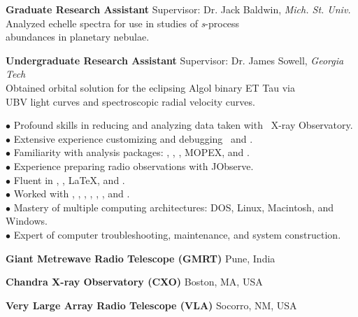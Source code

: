 \documentclass[12pt]{cv}
\begin{document}
\begin{llist}

{\sc \bf{Graduate Research Assistant}}
Supervisor: Dr. Jack Baldwin, {\textit{Mich. St. Univ.}}\\
Analyzed echelle spectra for use in studies of {\textit{s}}-process\\
abundances in planetary nebulae.

{\sc \bf{Undergraduate Research Assistant}}
Supervisor: Dr. James Sowell, {\textit{Georgia Tech}}\\
Obtained orbital solution for the eclipsing Algol binary ET Tau via\\
UBV light curves and spectroscopic radial velocity curves.



$\bullet$ Profound skills in reducing and analyzing data taken with \chandra\ X-ray Observatory.\\
$\bullet$ Extensive experience customizing and debugging \ciao\ and \caldb.\\
$\bullet$ Familiarity with analysis packages: \aips, \casa, \iraf, MOPEX, and \pyraf.\\
$\bullet$ Experience preparing radio observations with JObserve.\\
$\bullet$ Fluent in \html, \idl, \LaTeX, and \perl.\\
$\bullet$ Worked with \clang, \flash, \fortran, \mysql, \python, \supmo, and \tcl.\\
$\bullet$ Mastery of multiple computing architectures: DOS, Linux, Macintosh, and Windows.\\
$\bullet$ Expert of computer troubleshooting, maintenance, and system construction.



{\sc \bf{Giant Metrewave Radio Telescope (GMRT)}}
Pune, India

{\sc \bf{Chandra X-ray Observatory (CXO)}}
Boston, MA, USA

{\sc \bf{Very Large Array Radio Telescope (VLA)}}
Socorro, NM, USA


\end{llist}
\end{document}
